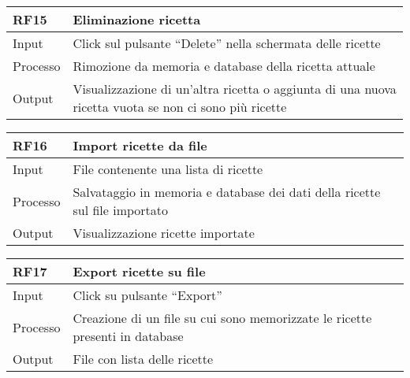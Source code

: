 \begin{table}[H]
    \begin{flushleft}
      \begin{tabular}{l|l}
        \toprule
        \textbf{RF15} & \textbf{Eliminazione ricetta}\\
        \midrule
        Input & Click sul pulsante “Delete” nella schermata delle ricette\\
        Processo & Rimozione da memoria e database della ricetta attuale\\
        Output & \makecell{Visualizzazione di un’altra ricetta o aggiunta di una nuova \\ ricetta vuota se non ci sono più ricette}\\
        \bottomrule
      \end{tabular}
    \end{flushleft}
\end{table}

\begin{table}[H]
    \begin{flushleft}
      \begin{tabular}{l|l}
        \toprule
        \textbf{RF16} & \textbf{Import ricette da file}\\
        \midrule
        Input & File contenente una lista di ricette\\
        Processo & Salvataggio in memoria e database dei dati della ricette sul file importato\\
        Output & Visualizzazione ricette importate\\
        \bottomrule
      \end{tabular}
    \end{flushleft}
\end{table}

\begin{table}[H]
    \begin{flushleft}
      \begin{tabular}{l|l}
        \toprule
        \textbf{RF17} & \textbf{Export ricette su file}\\
        \midrule
        Input & Click su pulsante “Export”\\
        Processo & Creazione di un file su cui sono memorizzate le ricette presenti in database\\
        Output & File con lista delle ricette\\
        \bottomrule
      \end{tabular}
    \end{flushleft}
\end{table}

